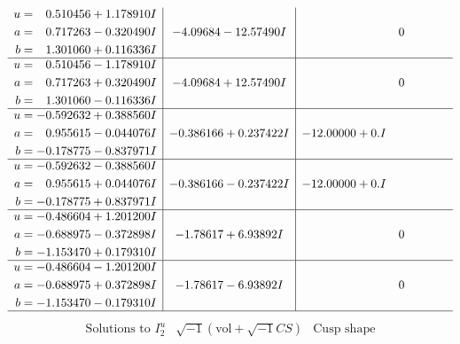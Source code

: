 \documentclass[1p]{elsarticle_modified}
\theoremstyle{definition}
\newcommand{\I}{\sqrt{-1}}
\begin{document}
$$\begin{array}{c|c|c}
\begin{aligned}
u &= \phantom{-}0.510456 + 1.178910 I \\
a &= \phantom{-}0.717263 - 0.320490 I \\
b &= \phantom{-}1.301060 + 0.116336 I\end{aligned}
 & -4.09684 - 12.57490 I & \phantom{-0.000000 } 0 \\ \hline\begin{aligned}
u &= \phantom{-}0.510456 - 1.178910 I \\
a &= \phantom{-}0.717263 + 0.320490 I \\
b &= \phantom{-}1.301060 - 0.116336 I\end{aligned}
 & -4.09684 + 12.57490 I & \phantom{-0.000000 } 0 \\ \hline\begin{aligned}
u &= -0.592632 + 0.388560 I \\
a &= \phantom{-}0.955615 - 0.044076 I \\
b &= -0.178775 - 0.837971 I\end{aligned}
 & -0.386166 + 0.237422 I & -12.00000 + 0. I\phantom{ +0.000000I} \\ \hline\begin{aligned}
u &= -0.592632 - 0.388560 I \\
a &= \phantom{-}0.955615 + 0.044076 I \\
b &= -0.178775 + 0.837971 I\end{aligned}
 & -0.386166 - 0.237422 I & -12.00000 + 0. I\phantom{ +0.000000I} \\ \hline\begin{aligned}
u &= -0.486604 + 1.201200 I \\
a &= -0.688975 - 0.372898 I \\
b &= -1.153470 + 0.179310 I\end{aligned}
 & -1.78617 + 6.93892 I & \phantom{-0.000000 } 0 \\ \hline\begin{aligned}
u &= -0.486604 - 1.201200 I \\
a &= -0.688975 + 0.372898 I \\
b &= -1.153470 - 0.179310 I\end{aligned}
 & -1.78617 - 6.93892 I & \phantom{-0.000000 } 0\\
 \hline 
 \end{array}$$\newpage$$\begin{array}{c|c|c}  
\text{Solutions to }I^u_{2}& \I (\text{vol} + \sqrt{-1}CS) & \text{Cusp shape}\\
 \hline 
\begin{aligned}

\end{aligned}
\end{array}$$
\end{document}
